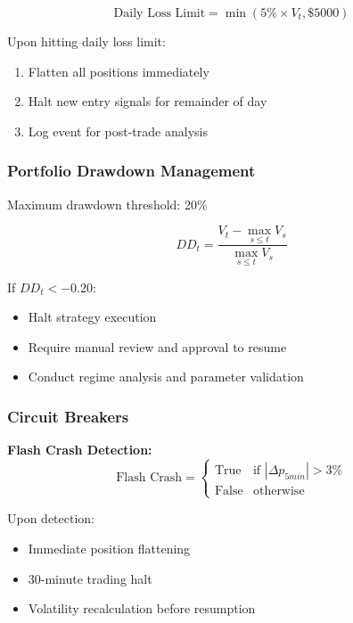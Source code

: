 \documentclass[twocolumn,ieee]{arithmaxresearch}
\begin{document}
\begin{equation}
\text{Daily Loss Limit} = \min(5\% \times V_t, \$5000)
\end{equation}

Upon hitting daily loss limit:
\begin{enumerate}
    \item Flatten all positions immediately
    \item Halt new entry signals for remainder of day
    \item Log event for post-trade analysis
\end{enumerate}

\subsubsection{Portfolio Drawdown Management}

Maximum drawdown threshold: 20\%

\begin{equation}
DD_t = \frac{V_t - \max_{s \leq t} V_s}{\max_{s \leq t} V_s}
\end{equation}

If $DD_t < -0.20$:
\begin{itemize}
    \item Halt strategy execution
    \item Require manual review and approval to resume
    \item Conduct regime analysis and parameter validation
\end{itemize}

\subsubsection{Circuit Breakers}

\textbf{Flash Crash Detection:}
\begin{equation}
\text{Flash Crash} = \begin{cases}
\text{True} & \text{if } |\Delta p_{5min}| > 3\% \\
\text{False} & \text{otherwise}
\end{cases}
\end{equation}

Upon detection:
\begin{itemize}
    \item Immediate position flattening
    \item 30-minute trading halt
    \item Volatility recalculation before resumption
\end{itemize}
\end{document}
